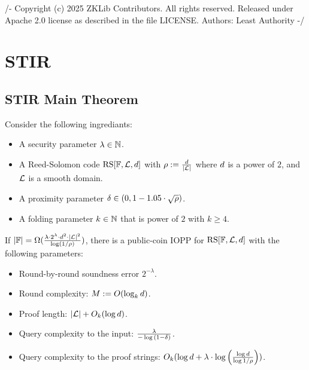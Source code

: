 /-
Copyright (c) 2025 ZKLib Contributors. All rights reserved.
Released under Apache 2.0 license as described in the file LICENSE.
Authors: Least Authority
-/

\chapter{STIR}
\section{STIR Main Theorem}\label{sec:stir_thm}
\begin{theorem}\label{thm:stir}
    Consider the following ingrediants:
    \begin{itemize}
        \item A security parameter $\lambda\in\mathbb{N}$.
        \item A Reed-Solomon code $\mathrm{RS}[\mathbb{F},\mathcal{L},d]$ with $\rho:=\frac{d}{|\mathcal{L}|}$ where $d$ is a power of $2$, and $\mathcal{L}$ is a smooth domain.
        \item A proximity parameter $\delta\in(0,1-1.05\cdot\sqrt{\rho})$.
        \item A folding parameter $k\in\mathbb{N}$ that is power of $2$ with $k\geq 4$.
    \end{itemize}
If $|\mathbb{F}|=\Omega(\frac{\lambda\cdot2^\lambda\cdot d^2\cdot{|\mathcal{L}|}^2}{\log(1/\rho)})$, there is a public-coin IOPP for $\mathrm{RS}[\mathbb{F},\mathcal{L},d]$ with the following parameters:
\begin{itemize}
    \item Round-by-round soundness error $2^{-\lambda}$.
    \item Round complexity: $M:=O(\log_k{d})$.
    \item Proof length: $|\mathcal{L}|+O_k(\log{d})$.
    \item Query complexity to the input: $\frac{\lambda}{-\log{(1-\delta)}}$.
    \item Query complexity to the proof strings: $O_k(\log{d}+\lambda\cdot\log{\Big(\frac{\log{d}}{\log{1/\rho}}\Big)})$.
\end{itemize}
\end{theorem}

